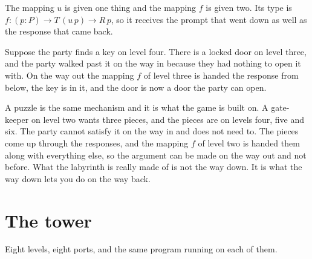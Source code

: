 \documentclass[11pt,a4paper]{article}
\begin{document}
The mapping $u$ is given one thing and the mapping $f$ is given two. Its type is
$f : (p : P) \to T\,(u\,p) \to R\,p$, so it receives the prompt that went down as well as the
response that came back.

Suppose the party finds a key on level four.
There is a locked door on level three, and the party walked past it on the way in because they
had nothing to open it with. On the way out the mapping $f$ of level three is handed the response
from below, the key is in it, and the door is now a door the party can open.

A puzzle is the same mechanism and it is what the game is built on. A gate-keeper on level two wants
three pieces, and the pieces are on levels four, five and six. The party cannot satisfy it on the
way in and does not need to. The pieces come up through the responses, and the mapping $f$ of level
two is handed them along with everything else, so the argument can be made on the way out and
not before. What the labyrinth is really made of is not the way down. It is what the way down
lets you do on the way back.

\section{The tower}
\label{sec:tower}

Eight levels, eight ports, and the same program running on each of them.

\begin{center}
\end{center}
\end{document}
